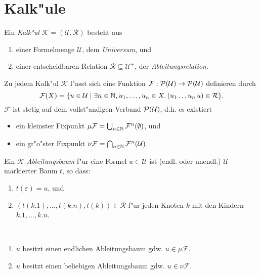 \documentclass[12pt,a4paper,final]{article}
\begin{document}

\section{Kalk"ule}
\label{sec:Kalkuele}

\begin{definition}[Kalk"ul]
  Ein \emph{Kalk"ul} \mbox{$\mathcal{K} = (\mathcal{U}, \mathcal{R})$} besteht aus
  \begin{enumerate}
  \item einer Formelmenge $\mathcal{U}$, dem \emph{Universum}, und
  \item einer entscheidbaren Relation $\mathcal{R} \subseteq \mathcal{U}^+$, der \emph{Ableitungsrelation}.
  \end{enumerate}
\end{definition}
Zu jedem Kalk"ul $\mathcal{K}$ l"asst sich eine Funktion
\mbox{$\mathcal{F}:\operatorname{\mathcal{P}}(\mathcal{U}) \to \operatorname{\mathcal{P}}(\mathcal{U})$} definieren durch
\begin{equation*}
\mathcal{F}(X) = \{u \in \mathcal{U} \mid \exists n\in\mathbb N,u_1,\ldots,u_n\in X.\,(u_1 \ldots u_n\,u) \in\mathcal{R}\}.
\end{equation*}
$\mathcal{F}$ ist stetig auf dem vollst"andigen Verband $\operatorname{\mathcal{P}}(\mathcal{U})$, d.h.\xspace es
existiert
\begin{itemize}
\item ein kleinster Fixpunkt $\mu\mathcal{F} = \bigcup_{n\in\mathbb N}\mathcal{F}^n(\emptyset)$, und
\item ein gr"o"ster Fixpunkt $\nu\mathcal{F} = \bigcap_{n\in\mathbb N}\mathcal{F}^n(\mathcal{U})$.
\end{itemize}
Ein \emph{$\mathcal{K}$-Ableitungsbaum} f"ur eine Formel $u \in \mathcal{U}$ ist (endl. oder unendl.)
$\mathcal{U}$-markierter Baum $t$, so dass:
\begin{enumerate}
\item $t(\varepsilon) = u$, und
\item $(t(k.1),\ldots,t(k.n),t(k)) \in \mathcal{R}$ f"ur jeden Knoten $k$ mit den Kindern $k.1,\ldots,k.n$.
\end{enumerate}

\begin{theorem} \
  \begin{enumerate}
  \item $u$ besitzt einen endlichen Ableitungsbaum gdw. $u \in \mu\mathcal{F}$.
  \item $u$ besitzt einen beliebigen Ableitungsbaum gdw. $u \in \nu\mathcal{F}$.
  \end{enumerate}
\end{theorem}
\end{document}
